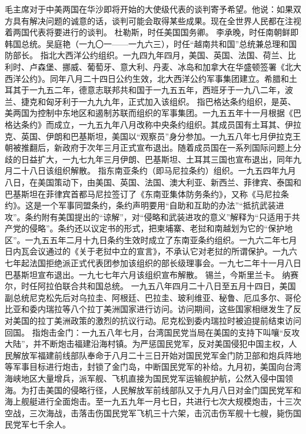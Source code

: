\begin{maonote}
毛主席对于中美两国在华沙即将开始的大使级代表的谈判寄予希望。他说：如果双方具有解决问题的诚意的话，谈判可能会取得某些成果。现在全世界人民都在注视着两国代表将要进行的谈判。
杜勒斯，时任美国国务卿。
李承晚，时任南朝鲜即韩国总统。吴庭艳（一九〇一——一九六三），时任“越南共和国”总统兼总理和国防部长。
指北大西洋公约组织。一九四九年四月，美国、英国、法国、荷兰、比利时、卢森堡、挪威、葡萄牙、意大利、丹麦、冰岛和加拿大在华盛顿签署《北大西洋公约》。同年八月二十四日公约生效，北大西洋公约军事集团建立。希腊和土耳其于一九五二年，德意志联邦共和国于一九五五年，西班牙于一九八二年，波兰、捷克和匈牙利于一九九九年，正式加入该组织。
指巴格达条约组织，是英、美两国为控制中东地区和遏制苏联而组织的军事集团。一九五五年十一月根据《巴格达条约》而成立，一九五九年八月改称中央条约组织。其成员国有土耳其、伊拉克、英国、伊朗和巴基斯坦，美国以“观察员”身分参加。一九五八年七月伊拉克王朝被推翻后，新政府于次年三月正式宣布退出。随着成员国在一系列国际问题上分歧的日益扩大，一九七九年三月伊朗、巴基斯坦、土耳其三国也宣布退出，同年九月二十八日该组织解散。
指东南亚条约（即马尼拉条约）组织。一九五四年九月八日，在美国策动下，由美国、英国、法国、澳大利亚、新西兰、菲律宾、泰国和巴基斯坦在菲律宾首都马尼拉签订了《东南亚集体防务条约》，又称《马尼拉条约》。这是一个军事同盟条约，条约声明要用“自助和互助的办法”“抵抗武装进攻”。条约附有美国提出的“谅解”，对“侵略和武装进攻的意义”解释为“只适用于共产党的侵略”。条约还以议定书的形式，把柬埔寨、老挝和南越划为它的“保护地区”。一九五五年二月十九日条约生效时成立了东南亚条约组织。一九六二年七月日内瓦会议通过的《关于老挝中立的宣言》，不承认它对老挝的所谓保护。一九六七年起法国拒绝派正式代表团参加该组织的部长级理事会。一九七二年十一月八日巴基斯坦宣布退出。一九七七年六月该组织宣布解散。
锡兰，今斯里兰卡。
纳赛尔，时任阿拉伯联合共和国总统。
一九五八年四月二十八日至五月十四日，美国副总统尼克松先后对乌拉圭、阿根廷、巴拉圭、玻利维亚、秘鲁、厄瓜多尔、哥伦比亚和委内瑞拉等八个拉丁美洲国家进行访问。访问期间，这些国家相继发生了反对美国的拉丁美洲政策的激烈的抗议行动。尼克松到委内瑞拉时被迫提前结束访问回国。
指炮击金门：一九五八年七月，台湾国民党当局在美国的支持下叫嚷“反攻大陆”，并不断炮击福建沿海村镇。为严惩国民党军，反对美国侵犯中国主权，人民解放军福建前线部队奉命于八月二十三日开始对国民党军金门防卫部和炮兵阵地等军事目标进行炮击，封锁了金门岛，中断国民党军的补给。九月初，美国向台湾海峡地区大量增兵，派军舰、飞机直接为国民党军运输舰护航，公然入侵中国领海。为打击美国的侵略行径，人民解放军前线部队又于九月八日对金门国民党军和海上舰艇进行全面炮击。至一九五九年一月七日，共进行七次大规模炮击，十三次空战，三次海战，击落击伤国民党军飞机三十六架，击沉击伤军舰十七艘，毙伤国民党军七千余人。

\end{maonote}
